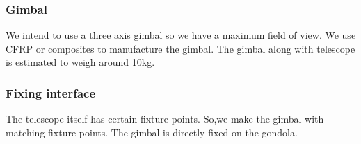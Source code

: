 \subsubsection{Gimbal}
\label {sec:4.4.3}
We intend to use a three axis gimbal so we have a maximum field of view. We use CFRP or composites to manufacture the gimbal. The gimbal along with telescope is estimated to weigh around 10kg.



\subsubsection{Fixing interface}
\label {sec:4.4.5}
The telescope itself has certain fixture points. So,we make the gimbal with matching fixture points. The gimbal is directly fixed on the gondola.